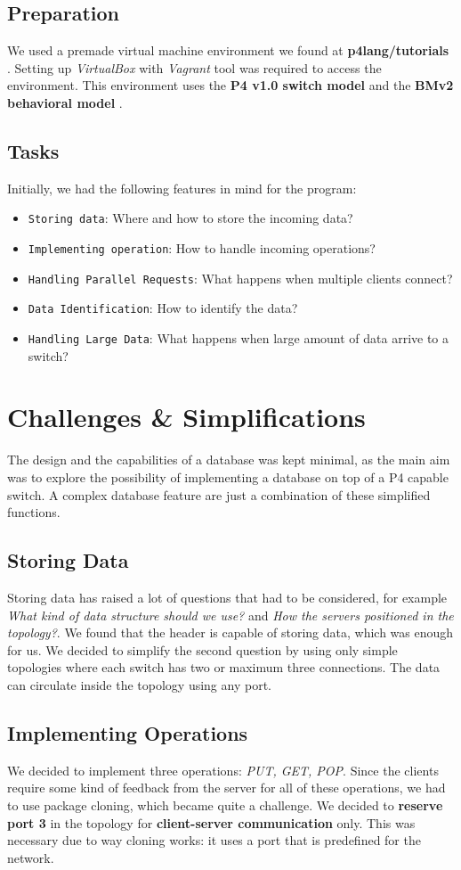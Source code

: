 \documentclass[sigconf,natbib=false]{acmart}
\begin{document}
\subsection{Preparation}
We used a premade virtual machine environment we found at \textbf{p4lang/tutorials} \cite{p4tut}. Setting up \textit{VirtualBox} with  \textit{Vagrant} tool was required to access the environment. This environment uses the \textbf{P4 v1.0 switch model} \cite{v1model} and the \textbf{BMv2 behavioral model} \cite{bmv2}.
\subsection{Tasks}
Initially, we had the following features in mind for the program:
\begin{itemize}
	\item {\verb|Storing data|}: Where and how to store the incoming data?
	\item{\verb|Implementing operation|}: How to handle incoming operations?
	\item{\verb|Handling Parallel Requests|}: What happens when multiple clients connect?
	\item{\verb|Data Identification|}: How to identify the data?
	\item{\verb|Handling Large Data|}: What happens when large amount of data arrive to a switch?
\end{itemize}

\section{Challenges \& Simplifications}
The design and the capabilities of a database was kept minimal, as the main aim was to explore the possibility of implementing a database on top of a P4 capable switch. A complex database feature are just a combination of these simplified functions.
\subsection{Storing Data}
Storing data has raised a lot of questions that had to be considered, for example \textit{What kind of data structure should we use?} and \textit{How the servers positioned in the topology?}. We found that the header is capable of storing data, which was enough for us. We decided to simplify the second question by using only simple topologies where each switch has two or maximum three connections. The data can circulate inside the topology using any port.
\subsection{Implementing Operations}
We decided to implement three operations: \textit{PUT, GET, POP}. Since the clients require some kind of feedback from the server for all of these operations, we had to use package cloning, which became quite a challenge. We decided to \textbf{reserve port 3} in the topology for \textbf{client-server communication} only. This was necessary due to way cloning works: it uses a port that is predefined for the network.
\end{document}
